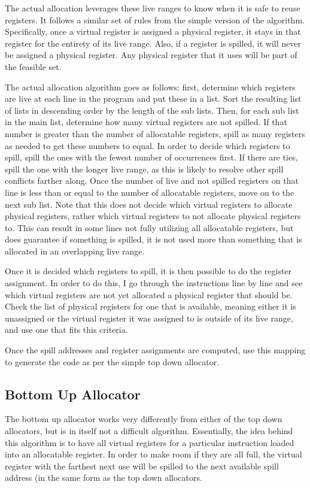 \documentclass[12pt]{article}
\begin{document}
    The actual allocation leverages these live ranges to know when it is safe to
    reuse registers. It follows a similar set of rules from the simple version
    of the algorithm. Specifically, once a virtual register is assigned a
    physical register, it stays in that register for the entirety of its live
    range. Also, if a register is spilled, it will never be assigned a physical
    register. Any physical register that it uses will be part of the feasible
    set.

    The actual allocation algorithm goes as follows: first, determine which
    registers are live at each line in the program and put these in a list. Sort
    the resulting list of lists in descending order by the length of the sub
    lists. Then, for each sub list in the main list, determine how many virtual
    registers are not spilled. If that number is greater than the number of
    allocatable registers, spill as many registers as needed to get these
    numbers to equal. In order to decide which registers to spill, spill the
    ones with the fewest number of occurrences first. If there are ties, spill
    the one with the longer live range, as this is likely to resolve other spill
    conflicts farther along. Once the number of live and not spilled registers
    on that line is less than or equal to the number of allocatable registers,
    move on to the next sub list. Note that this does not decide which virtual
    registers to allocate physical registers, rather which virtual registers to
    not allocate physical registers to. This can result in some lines not fully
    utilizing all allocatable registers, but does guarantee if something is
    spilled, it is not used more than something that is allocated in an
    overlapping live range.

    Once it is decided which registers to spill, it is then possible to do the
    register assignment. In order to do this, I go through the instructions line
    by line and see which virtual registers are not yet allocated a physical
    register that should be. Check the list of physical registers for one that
    is available, meaning either it is unassigned or the virtual register it was
    assigned to is outside of its live range, and use one that fits this
    criteria.

    Once the spill addresses and register assignments are computed, use this
    mapping to generate the code as per the simple top down allocator.


    \subsection{Bottom Up Allocator}
    The bottom up allocator works very differently from either of the top down
    allocators, but is in itself not a difficult algorithm. Essentially, the
    idea behind this algorithm is to have all virtual registers for a
    particular instruction loaded into an allocatable register. In order to make
    room if they are all full, the virtual register with the farthest next use
    will be spilled to the next available spill address (in the same form as the
    top down allocators.
\end{document}
